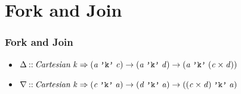 \documentclass{beamer}
\theoremstyle{definition}
\theoremstyle{definition}
\theoremstyle{theorem}
\newcommand{\Conid}[1]{\mathit{#1}}
\newcommand{\Varid}[1]{\mathit{#1}}
\newenvironment{slide}[1]{\begin{frame}\frametitle{#1}}{\end{frame}}
\begin{document}
\section{Fork and Join}
\begin{slide}{Fork and Join}
    \begin{itemize}
        \item
            \ensuremath{ \Delta \mathbin{::}\Conid{Cartesian}\;\Varid{k}\Rightarrow(\Varid{a}\;\text{\tt 'k'}\;\Varid{c})\rightarrow (\Varid{a}\;\text{\tt 'k'}\;\Varid{d})\rightarrow (\Varid{a}\;\text{\tt 'k'}\;(\Varid{c} \times \Varid{d}))}
            \xymatrix@R=5mm{
                & \\
                \ar[ur]\ar[dr] \\
                & 
            }
        \item
            \ensuremath{ \nabla \mathbin{::}\Conid{Cartesian}\;\Varid{k}\Rightarrow(\Varid{c}\;\text{\tt 'k'}\;\Varid{a})\rightarrow (\Varid{d}\;\text{\tt 'k'}\;\Varid{a})\rightarrow ((\Varid{c} \times \Varid{d})\;\text{\tt 'k'}\;\Varid{a})}
            \xymatrix@R=5mm{
                \ar[dr]\\
                &  \\
                \ar[ur]
            }
    \end{itemize}
\end{slide}
\end{document}
